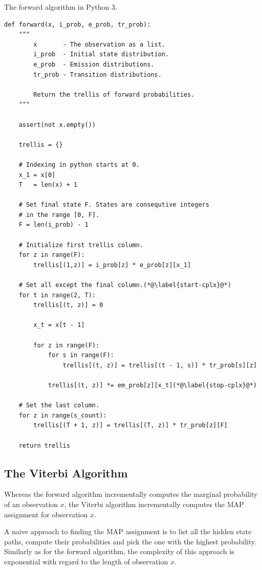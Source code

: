 \begin{algorithm}[!p]
\begin{center}
\caption{The forward algorithm in Python 3.}\label{forward-algorithm}
\begin{lstlisting}[linewidth=\textwidth]
def forward(x, i_prob, e_prob, tr_prob): 
    """
        x       - The observation as a list.
        i_prob  - Initial state distribution.
        e_prob  - Emission distributions.
        tr_prob - Transition distributions.

        Return the trellis of forward probabilities. 
    """

    assert(not x.empty()) 

    trellis = {}

    # Indexing in python starts at 0.
    x_1 = x[0]
    T   = len(x) + 1

    # Set final state F. States are consequtive integers 
    # in the range [0, F]. 
    F = len(i_prob) - 1 

    # Initialize first trellis column.
    for z in range(F):
        trellis[(1,z)] = i_prob[z] * e_prob[z][x_1]

    # Set all except the final column.(*@\label{start-cplx}@*)
    for t in range(2, T):
        trellis[(t, z)] = 0

        x_t = x[t - 1]

        for z in range(F):
            for s in range(F):
                trellis[(t, z)] = trellis[(t - 1, s)] * tr_prob[s][z]

            trellis[(t, z)] *= em_prob[z][x_t](*@\label{stop-cplx}@*)

    # Set the last column.
    for z in range(s_count):
        trellis[(T + 1, z)] = trellis[(T, z)] * tr_prob[z][F]

    return trellis 
\end{lstlisting}
\end{center}
\end{algorithm}

\subsection{The Viterbi Algorithm}
\label{hmm-viterbi}

Whereas the forward algorithm incrementally computes the marginal
probability of an observation $x$, the Viterbi algorithm incrementally
computes the MAP assignment for observation $x$.

A naive approach to finding the MAP assignment is to list all the
hidden state paths, compute their probabilities and pick the one with
the highest probability. Similarly as for the forward algorithm, the
complexity of this approach is exponential with regard to the length
of observation $x$.

